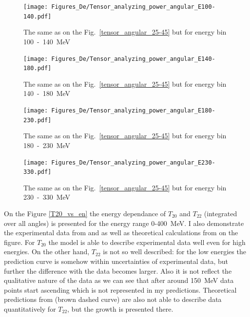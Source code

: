     \begin{figure}[h]
        \begin{center}
        \texttt{[image: Figures\_De/Tensor\_analyzing\_power\_angular\_E100-140.pdf]}
        \end{center}
        \caption{The same as on the Fig.~\ref*{tensor_angular_25-45} but for energy bin 100~-~140~MeV}
        \label{tensor_angular_100-140}
    \end{figure}
        
        

    \begin{figure}[h]
        \begin{center}
        \texttt{[image: Figures\_De/Tensor\_analyzing\_power\_angular\_E140-180.pdf]}
        \end{center}
        \caption{The same as on the Fig.~\ref*{tensor_angular_25-45} but for energy bin 140~-~180~MeV}
        \label{tensor_angular_140-180}
    \end{figure}
        

    \begin{figure}[h]
        \begin{center}
        \texttt{[image: Figures\_De/Tensor\_analyzing\_power\_angular\_E180-230.pdf]}
        \end{center}
        \caption{The same as on the Fig.~\ref*{tensor_angular_25-45} but for energy bin 180~-~230~MeV}
        \label{tensor_angular_180-230}
    \end{figure}

    \begin{figure}[h]
        \begin{center}
        \texttt{[image: Figures\_De/Tensor\_analyzing\_power\_angular\_E230-330.pdf]}
        \end{center}
        \caption{The same as on the Fig.~\ref*{tensor_angular_25-45} but for energy bin 230~-~330~MeV}
        \label{tensor_angular_230-330}
    \end{figure}
        


    On the Figure \ref{T20_vs_en} the energy dependance of $T_{20}$ and $T_{22}$
    (integrated over all angles)
    is presented for the energy range 0-400~MeV. I also demonstrate the experimental data from
    \cite{rachek2007} and \cite{mishev1993} as well as theoretical calculations from \cite{Schmitt1989}
    on the figure. For $T_{20}$ the model is able to describe experimental data well even for
    high energies. On the other hand, $T_{22}$ is not so well described: for the low 
    energies the prediction curve is somehow within uncertainties of experimental data,
    but further the difference with the data becomes larger. Also it is not 
    reflect the qualitative nature of the data as we can see that after around 150~MeV
    data points start ascending which is not represented in my predictions.
    Theoretical predictions from \cite{Schmitt1989} (brown dashed curve) are also not able
    to describe data quantitatively for $T_{22}$, but the growth is presented there. 

